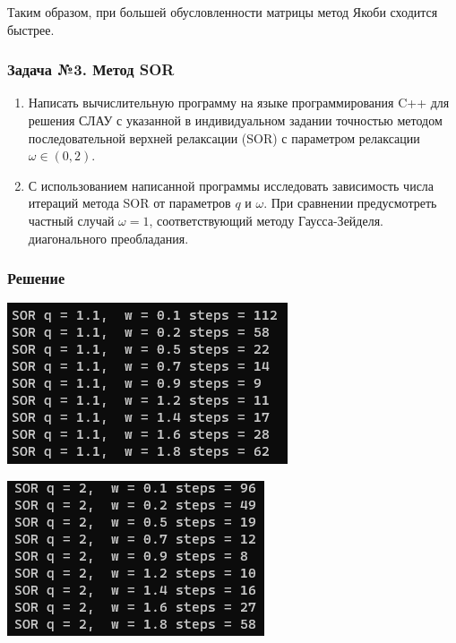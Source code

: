 \documentclass[a4paper, fontsize=14pt]{article}
\begin{document}
Таким образом, при большей обусловленности матрицы метод Якоби сходится быстрее.

\subsubsection*{Задача №3. Метод SOR}
\begin{enumerate}
    
    \item Написать вычислительную программу на языке программирования C++
    для решения СЛАУ с указанной в индивидуальном задании точностью
    методом последовательной верхней релаксации (SOR) с параметром
    релаксации $\omega\in(0,2)$.
    \item С использованием написанной программы исследовать зависимость
    числа итераций метода SOR от параметров $q$ и $\omega$. При сравнении
    предусмотреть частный случай $\omega = 1$, соответствующий методу Гаусса-Зейделя.
диагонального преобладания.
\end{enumerate}
\subsubsection*{Решение}
\begin{center}
    \includegraphics[]{src/sor11.png}
    \label{fig:sor11}
\end{center}


\begin{center}
    \includegraphics[]{src/sor2.png}
    \label{fig:sor2}
\end{center}
\end{document}

